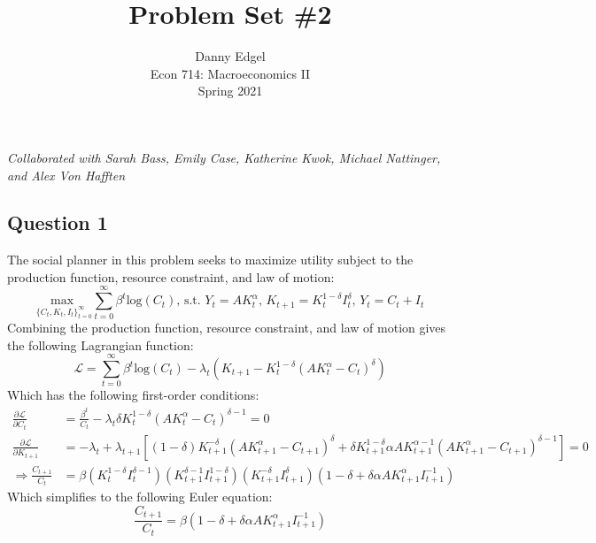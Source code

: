\documentclass{article}
\newcommand{\loge}[1]{\text{log}\left(#1\right)}
\newcommand{\usmax}[1]{\underset{#1}{\text{max }}}
\renewcommand{\L}{\mathcal{L}}
\newcommand{\suminf}{\sum_{t=0}^\infty}
\begin{document}
\title{	Problem Set \#2 }
\author{ 	Danny Edgel 					\\ 
			Econ 714: Macroeconomics II		\\
			Spring 2021						\\
		}
\maketitle\thispagestyle{empty}


\noindent\textit{Collaborated with Sarah Bass, Emily Case, Katherine Kwok, Michael Nattinger, and Alex Von Hafften}


\subsection*{Question 1}
The social planner in this problem seeks to maximize utility subject to the production function, resource constraint, and law of motion:
\[
	\usmax{\{C_t,K_t,I_t\}_{t=0}^\infty}\suminf\beta^t\loge{C_t}\text{, s.t. }Y_t=AK_t^\alpha\text{, }K_{t+1}=K_t^{1-\delta}I_t^\delta\text{, }Y_t=C_t + I_t
\]
Combining the production function, resource constraint, and law of motion gives the following Lagrangian function:
\[
	\L = \suminf \beta^t\loge{C_t} - \lambda_t\left(K_{t+1} - K_t^{1-\delta}(AK_t^\alpha-C_t)^\delta\right)
\]
Which has the following first-order conditions:
\begin{align*}
	\frac{\partial\L}{\partial C_t} 	&= \frac{\beta^t}{C_t} - \lambda_t\delta K_t^{1-\delta}\left(AK_t^\alpha-C_t\right)^{\delta-1} 						= 0	\\
	\frac{\partial\L}{\partial K_{t+1}} 
		&= -\lambda_t + 
		\lambda_{t+1}\left[(1-\delta)K_{t+1}^{-\delta}\left(AK_{t+1}^\alpha-C_{t+1}\right)^\delta + \delta K_{t+1}^{1-\delta}\alpha AK_{t+1}^{\alpha-1}\left(AK_{t+1}^\alpha - C_{t+1}\right)^{\delta-1}\right] = 0 	\\
	\Rightarrow	\frac{C_{t+1}}{C_t} 
	&= \beta \left(K_t^{1-\delta}I_t^{\delta-1}\right)\left(K_{t+1}^{\delta-1}I_{t+1}^{1-\delta}\right)\left(K_{t+1}^{-\delta}I_{t+1}^\delta\right)\left(1-\delta + \delta\alpha AK_{t+1}^\alpha I_{t+1}^{-1}\right)
\end{align*}
Which simplifies to the following Euler equation:
\[
	\frac{C_{t+1}}{C_t} = \beta \left(1-\delta+\delta\alpha AK_{t+1}^\alpha I_{t+1}^{-1}\right)
\]
\end{document}

